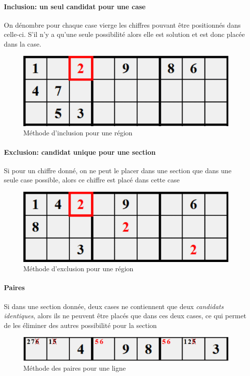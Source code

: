 \documentclass[12pt,a4paper]{report}
\begin{document}
\paragraph{Inclusion: un seul candidat pour une case}
On dénombre pour chaque case vierge les chiffres pouvant être positionnés dans celle-ci. S'il n'y a qu'une seule possibilité alors elle est solution et est donc placée dans la case.
\begin{figure}[!h]
 \center
 \includegraphics[scale=0.6]{../pictures/inclusion}
 \caption{Méthode d'inclusion pour une région}
\end{figure}

\paragraph{Exclusion: candidat unique pour une section}
Si pour un chiffre donné, on ne peut le placer dans une section que dans une seule case possible, alors ce chiffre est placé dans cette case
\begin{figure}[!h]
 \center
 \includegraphics[scale=0.6]{../pictures/exclusion}
 \caption{Méthode d'exclusion pour une région}
\end{figure}

\paragraph{Paires} Si dans une section donnée, deux cases ne contiennent que deux \emph{candidats identiques}, alors ils ne peuvent être placés que dans ces deux cases, ce qui permet de les éliminer des autres possibilité pour la section
\begin{figure}[!h]
 \center
 \includegraphics[scale=0.6]{../pictures/paire}
 \caption{Méthode des paires pour une ligne}
\end{figure}
\end{document}
